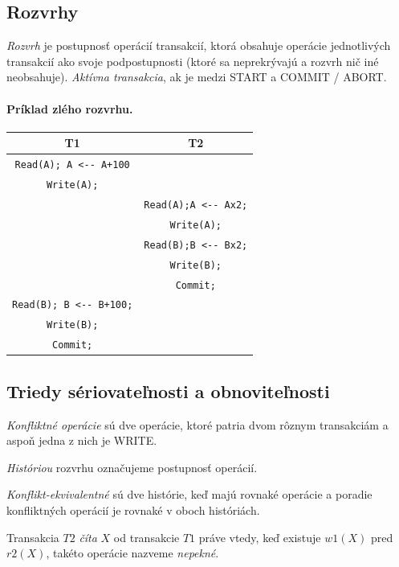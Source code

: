 \documentclass[10pt,a4paper]{article}
\begin{document}
\subsection{Rozvrhy}

\emph{Rozvrh} je postupnosť operácií transakcií, ktorá obsahuje operácie jednotlivých transakcií ako svoje podpostupnosti (ktoré sa neprekrývajú a rozvrh nič iné neobsahuje). 
\emph{Aktívna transakcia}, ak je medzi START a COMMIT / ABORT. 

\paragraph{Príklad zlého rozvrhu.}
\begin{center}
\begin{tabular}{c|c}
T1 & T2 \\
\hline
\verb|Read(A); A <-- A+100| & \\
\verb|Write(A);| & \\
& \verb|Read(A);A <-- Ax2;| \\
& \verb|Write(A);| \\
& \verb|Read(B);B <-- Bx2;| \\
& \verb|Write(B);| \\
& \verb|Commit;| \\
\verb|Read(B); B <-- B+100;| & \\
\verb|Write(B);| & \\
\verb|Commit;| & \\
\end{tabular}
\end{center}

\subsection{Triedy sériovateľnosti a obnoviteľnosti}

\emph{Konfliktné operácie} sú dve operácie, ktoré patria dvom rôznym transakciám a aspoň jedna z nich je WRITE. 

\emph{Históriou} rozvrhu označujeme postupnosť operácií. 

\emph{Konflikt-ekvivalentné} sú dve histórie, keď majú rovnaké operácie a poradie konfliktných operácií je rovnaké v oboch históriách. 

Transakcia $T2$ \emph{číta} $X$ od transakcie $T1$ práve vtedy, keď existuje $w1(X)$ pred $r2(X)$,
takéto operácie nazveme \emph{nepekné}. 
\end{document}
